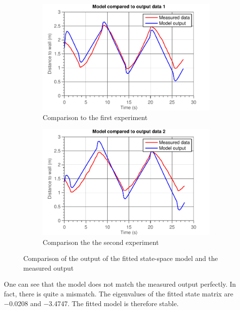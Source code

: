 \documentclass[11pt,titlepage]{report}
\begin{document}
\begin{figure}[H]
	\begin{subfigure}{.5\textwidth}
		\begin{center}
			\includegraphics[width=\linewidth]{resource/model-fit1.pdf}
		\end{center}
		\caption{Comparison to the first experiment}
	\end{subfigure}
	\begin{subfigure}{.5\textwidth}
		\begin{center}
			\includegraphics[width=\linewidth]{resource/model-fit2.pdf}
		\end{center}
		\caption{Comparison the the second experiment}
	\end{subfigure}
	\caption{Comparison of the output of the fitted state-space model and the measured output}
	\label{fig:ass-1-comp}
\end{figure}

One can see that the model does not match the measured output perfectly. In fact, there is quite a mismatch. The eigenvalues of the fitted state matrix are \num{-0.0208} and \num{-3.4747}. The fitted model is therefore stable.
\end{document}
